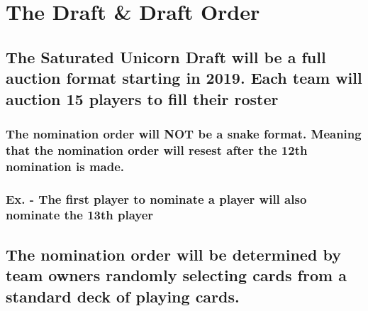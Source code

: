 \documentclass[]{book}
\begin{document}
\hypertarget{the-draft-draft-order}{%
\section{The Draft \& Draft Order}\label{the-draft-draft-order}}

\hypertarget{the-saturated-unicorn-draft-will-be-a-full-auction-format-starting-in-2019.-each-team-will-auction-15-players-to-fill-their-roster}{%
\subsection{The Saturated Unicorn Draft will be a full auction format starting in 2019. Each team will auction 15 players to fill their roster}\label{the-saturated-unicorn-draft-will-be-a-full-auction-format-starting-in-2019.-each-team-will-auction-15-players-to-fill-their-roster}}

\hypertarget{the-nomination-order-will-not-be-a-snake-format.-meaning-that-the-nomination-order-will-resest-after-the-12th-nomination-is-made.}{%
\subsubsection{The nomination order will NOT be a snake format. Meaning that the nomination order will resest after the 12th nomination is made.}\label{the-nomination-order-will-not-be-a-snake-format.-meaning-that-the-nomination-order-will-resest-after-the-12th-nomination-is-made.}}

\hypertarget{ex.---the-first-player-to-nominate-a-player-will-also-nominate-the-13th-player}{%
\subsubsection{Ex. - The first player to nominate a player will also nominate the 13th player}\label{ex.---the-first-player-to-nominate-a-player-will-also-nominate-the-13th-player}}

\hypertarget{the-nomination-order-will-be-determined-by-team-owners-randomly-selecting-cards-from-a-standard-deck-of-playing-cards.}{%
\subsection{The nomination order will be determined by team owners randomly selecting cards from a standard deck of playing cards.}\label{the-nomination-order-will-be-determined-by-team-owners-randomly-selecting-cards-from-a-standard-deck-of-playing-cards.}}
\end{document}
